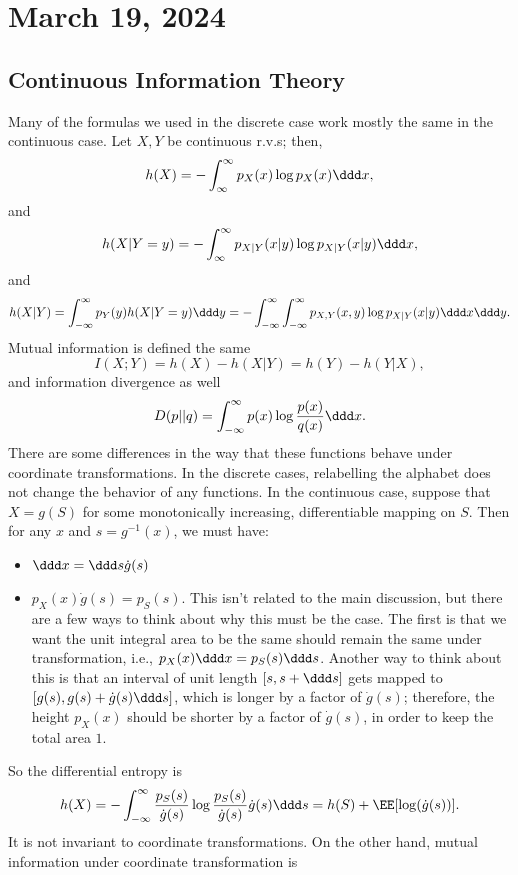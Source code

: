 \section{March 19, 2024}

\subsection{Continuous Information Theory}

Many of the formulas we used in the discrete case work mostly the same in the continuous case. Let $X,Y$ be continuous r.v.s; then, 
\[h(X) = -\int_{\infty}^{\infty} p_X(x) \log p_X(x)\ddd x,\] 
and 
\[h(X|Y=y) = -\int_{\infty}^{\infty}p_{X|Y}(x|y)\log p_{X|Y}(x|y)\ddd x,\]
and 
\[h(X|Y) = \int_{-\infty}^{\infty}p_Y(y)h(X|Y=y)\ddd y = -\int_{-\infty}^{\infty}\int_{-\infty}^{\infty} p_{X,Y}(x,y)\log p_{X|Y}(x|y)\ddd x \ddd y.\] 
Mutual information is defined the same
\[I(X;Y) = h(X) - h(X|Y) = h(Y) - h(Y|X),\]
and information divergence as well
\[D(p||q) = \int_{-\infty}^{\infty}p(x) \log \frac{p(x)}{q(x)}\ddd x.\] 
There are some differences in the way that these functions behave under coordinate transformations. In the discrete cases, relabelling the alphabet does not change the behavior of any functions. In the continuous case, suppose that $X = g(S)$ for some monotonically increasing, differentiable mapping on $S$. Then for any $x$ and $s = g^{-1}(x)$, we must have:
\begin{itemize}
	\item $\ddd x = \ddd s \dot{g}(s)$
	\item $p_X(x)\dot{g}(s) = p_S(s)$. This isn't related to the main discussion, but there are a few ways to think about why this must be the case. The first is that we want the unit integral area to be the same should remain the same under transformation, i.e., $p_X(x) \ddd x = p_S(s) \ddd s$. Another way to think about this is that an interval of unit length $[s, s+\ddd s]$ gets mapped to $[g(s), g(s)+\dot{g}(s)\ddd s]$, which is longer by a factor of $\dot{g}(s)$; therefore, the height $p_X(x)$ should be shorter by a factor of $\dot{g}(s)$, in order to keep the total area $1$. 
\end{itemize}
So the differential entropy is
\begin{align*}
	h(X) = -\int_{-\infty}^{\infty}\frac{p_S(s)}{\dot{g}(s)}\log \frac{p_S(s)}{\dot{g}(s)} \dot{g}(s)\ddd s = h(S) + \EE[\log(\dot{g}(s))].
\end{align*}
It is not invariant to coordinate transformations. On the other hand, mutual information under coordinate transformation is 
